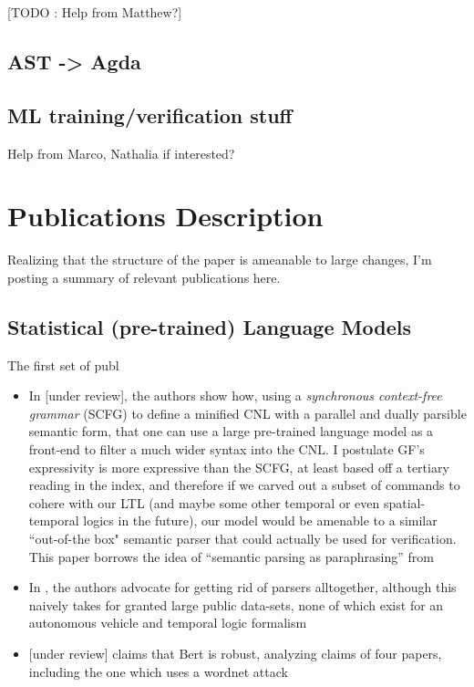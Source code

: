 \documentclass[a4paper, 11pt]{article}
\begin{document}
[TODO : Help from Matthew?]

\subsection{AST -> Agda}

\subsection{ML training/verification stuff}
Help from Marco, Nathalia if interested?


\section{Publications Description}

Realizing that the structure of the paper is ameanable to large changes, I'm
posting a summary of relevant publications here.

\subsection{Statistical (pre-trained) Language Models}
The first set of publ

\begin{itemize}

\item In \cite{fewShotSem} [under review], the authors show how, using a \emph{synchronous
context-free grammar} (SCFG) to define a minified CNL with a parallel and dually
parsible semantic form, that one can use a large pre-trained language model as a front-end
to filter a much wider syntax into the CNL. I postulate GF's expressivity is
more expressive than the SCFG, at least based off a tertiary reading in the
index, and therefore if we carved out a subset of commands to cohere with our
LTL (and maybe some other temporal or even spatial-temporal logics in the
future), our model would be amenable to a similar ``out-of-the box" semantic
parser that could actually be used for verification. This paper borrows the idea
of ``semantic parsing as paraphrasing'' from  \cite{berant-liang-2014-semantic}

\item In \cite{dontParse}, the authors advocate for getting rid of parsers
  alltogether, although this naively takes for granted large public data-sets,
  none of which exist for an autonomous vehicle and temporal logic formalism
\item  \cite{hauser2021bert} [under review] claims that Bert is robust, analyzing claims of four
  papers, including the one which uses a wordnet attack

\end{itemize}
\end{document}
